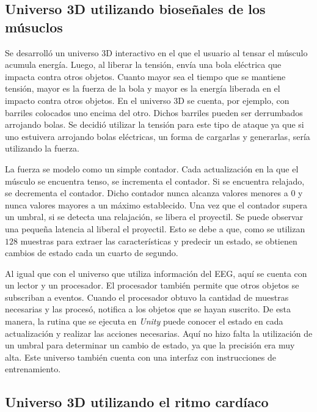 \subsection{Universo 3D utilizando bioseñales de los músuclos}

Se desarrolló un universo 3D interactivo en el que el usuario al tensar el músculo acumula energía. Luego, al liberar la tensión, envía una bola eléctrica que impacta contra otros objetos. Cuanto mayor sea el tiempo que se mantiene tensión, mayor es la fuerza de la bola y mayor es la energía liberada en el impacto contra otros objetos. En el universo 3D se cuenta, por ejemplo, con barriles colocados uno encima del otro. Dichos barriles pueden ser derrumbados arrojando bolas. Se decidió utilizar la tensión para este tipo de ataque ya que si uno estuivera arrojando bolas eléctricas, un forma de cargarlas y generarlas, sería utilizando la fuerza. 

La fuerza se modelo como un simple contador. Cada actualización en la que el músculo se encuentra tenso, se incrementa el contador. Si se encuentra relajado, se decrementa el contador. Dicho contador nunca alcanza valores menores a $0$ y nunca valores mayores a un máximo establecido. Una vez que el contador supera un umbral, si se detecta una relajación, se libera el proyectil. Se puede observar una pequeña latencia al liberal el proyectil. Esto se debe a que, como se utilizan $128$ muestras para extraer las características y predecir un estado, se obtienen cambios de estado cada un cuarto de  segundo.

Al igual que con el universo que utiliza información del EEG, aquí se cuenta con un lector y un procesador. El procesador también permite que otros objetos se subscriban a eventos. Cuando el procesador obtuvo la cantidad de muestras necesarias y las procesó, notifica a los objetos que se hayan suscrito. De esta manera, la rutina que se ejecuta en \emph{Unity} puede conocer el estado en cada actualización y realizar las acciones necesarias. Aquí no hizo falta la utilización de un umbral para determinar un cambio de estado, ya que la precisión era muy alta. Este universo también cuenta con una interfaz con instrucciones de entrenamiento.

\subsection{Universo 3D utilizando el ritmo cardíaco}

